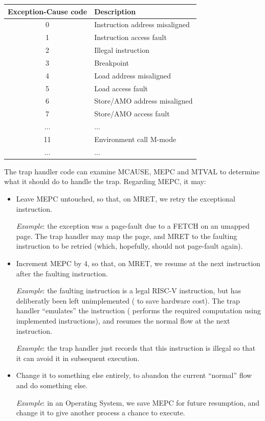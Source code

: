 \begin{center}
 \begin{tabular}{|c|l|}
  \hline
  Exception-Cause code & Description \\
  \hline
  0 & Instruction address misaligned \\
  1 & Instruction access fault \\
  2 & Illegal instruction \\
  3 & Breakpoint \\
  4 & Load address misaligned \\
  5 & Load access fault \\
  6 & Store/AMO address misaligned \\
  7 & Store/AMO access fault \\
  ... & ... \\
  11 & Environment call M-mode \\
  ... & ... \\
  \hline
 \end{tabular}
\end{center}

The trap handler code can examine MCAUSE, MEPC and MTVAL to determine
what it should do to handle the trap.  Regarding MEPC, it may:
\begin{itemize}

 \item Leave MEPC untouched, so that, on MRET, we retry the
       exceptional instruction.

       \emph{Example}: the exception was a page-fault due to a FETCH
       on an umapped page.  The trap handler may map the page, and
       MRET to the faulting instruction to be retried (which,
       hopefully, should not page-fault again).

 \item Increment MEPC by 4, so that, on MRET, we resume at the next
       instruction after the faulting instruction.

       \emph{Example}: the faulting instruction is a legal RISC-V
       instruction, but has deliberatly been left unimplemented ({\eg}
       to save hardware cost).  The trap handler ``emulates'' the
       instruction ({\ie} performs the required computation using
       implemented instructions), and resumes the normal flow at the
       next instruction.

       \emph{Example}: the trap handler just records that this
       instruction is illegal so that it can avoid it in subsequent
       execution.

 \item Change it to something else entirely, to abandon the current
        ``normal'' flow and do something else.

       \emph{Example}: in an Operating System, we save MEPC for future
       resumption, and change it to give another process a chance to
       execute.
\end{itemize}

